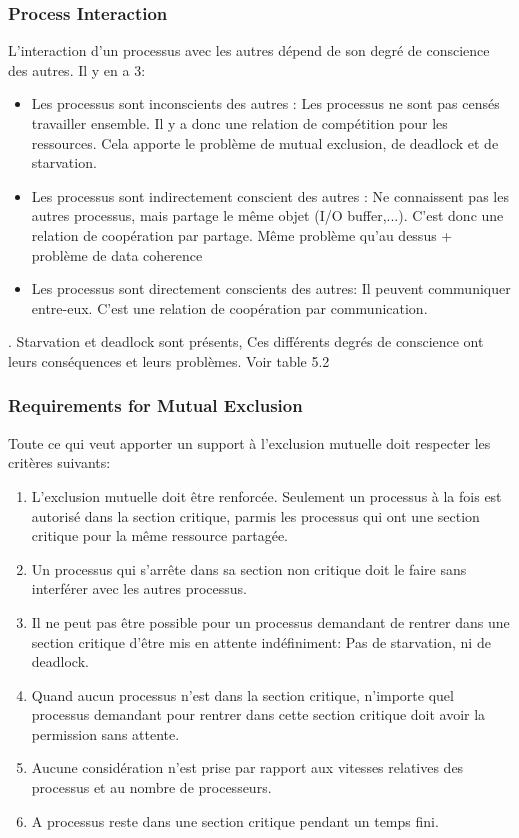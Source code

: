 \subsubsection{Process Interaction}
L'interaction d'un processus avec les autres dépend de son degré de conscience des autres. Il y en a 3:
\begin{itemize}
  \item Les processus sont inconscients des autres : Les processus ne sont pas censés travailler ensemble. Il y a donc une relation de compétition pour les ressources. Cela apporte le problème de mutual exclusion, de deadlock et de starvation.
  \item Les processus sont indirectement conscient des autres : Ne connaissent pas les autres processus, mais partage le même objet (I/O buffer,...). C'est donc une relation de coopération par partage. Même problème qu'au dessus + problème de data coherence
  \item Les processus sont directement conscients des autres: Il peuvent communiquer entre-eux. C'est une relation de coopération par communication.
\end{itemize}
. Starvation et deadlock sont présents, Ces différents degrés de conscience ont leurs conséquences et leurs problèmes. Voir table 5.2 \cite[p.~225]{stallings}
\subsubsection{Requirements for Mutual Exclusion}
Toute ce qui veut apporter un support à l'exclusion mutuelle doit respecter les critères suivants:
\begin{enumerate}
  \item L'exclusion mutuelle doit être renforcée. Seulement un processus à la fois est autorisé dans la section critique, parmis les processus qui ont une section critique pour la même ressource partagée.
  \item Un processus qui s'arrête dans sa section non critique doit le faire sans interférer avec les autres processus.
  \item Il ne peut pas être possible pour un processus demandant de rentrer dans une section critique d'être mis en attente indéfiniment: Pas de starvation, ni de deadlock.
  \item Quand aucun processus n'est dans la section critique, n'importe quel processus demandant pour rentrer dans cette section critique doit avoir la permission sans attente.
  \item Aucune considération n'est prise par rapport aux vitesses relatives des processus et au nombre de processeurs.
  \item A processus reste dans une section critique pendant un temps fini.
\end{enumerate}

